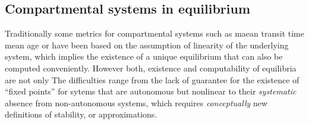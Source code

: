\subsection{Compartmental systems in equilibrium} \label{sec:Equilibrium}
Traditionally some metrics for compartmental systems such as maean transit time mean age or have been based on the assumption of linearity of the underlying system, which implies the existence of a unique equilibrium that can also be computed conveniently.
However both, existence and computability of equilibria are not only 
The difficulties range from the lack of guarantee for the existence of ``fixed points'' for sytems that are autonomous but nonlinear to their \emph{systematic} absence from non-autonomous systems, which requires \emph{conceptually} new definitions of stability, or approximations. 
